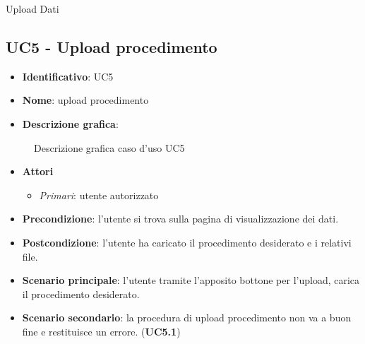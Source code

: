 \begin{usecase}{5}{Upload Dati}
  \label{uc:upload-dati}
\end{usecase}

\subsection{UC5 - Upload procedimento}
\begin{itemize}
  \item \textbf{Identificativo}: UC5
  \item \textbf{Nome}: upload procedimento
  \item \textbf{Descrizione grafica}:
\end{itemize}

\begin{figure}[h]
  \centering
  \caption{Descrizione grafica caso d'uso UC5}
\end{figure}

\begin{itemize}
  \item \textbf{Attori}
        \begin{itemize}
          \item \textit{Primari}: utente autorizzato
        \end{itemize}
  \item \textbf{Precondizione}: l'utente si trova sulla pagina di visualizzazione dei dati.
  \item \textbf{Postcondizione}: l'utente ha caricato il procedimento desiderato e i relativi file.
  \item \textbf{Scenario principale}: l'utente tramite l'apposito bottone per l'upload, carica il procedimento desiderato.
  \item \textbf{Scenario secondario}: la procedura di upload procedimento non va a buon fine e restituisce un errore. (\textbf{UC5.1})
\end{itemize}

